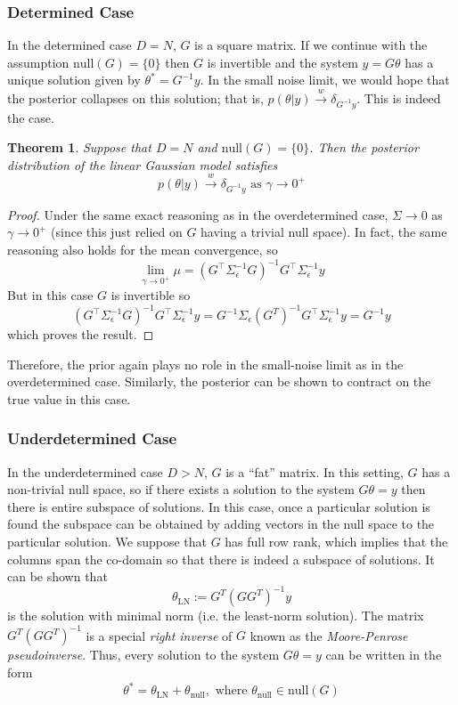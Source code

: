 \documentclass[12pt]{article}
\newtheorem{thm}{Theorem}
\begin{document}
\subsubsection{Determined Case}
In the determined case $D = N$, $G$ is a square matrix. If we continue with the assumption $\text{null}(G) = \{0\}$ then $G$ is invertible and the system $y = G\theta$ has 
a unique solution given by $\theta^* = G^{-1}y$. In the small noise limit, we would hope that the posterior collapses on this solution; that is, 
$p(\theta|y) \overset{w}{\to} \delta_{G^{-1}y}$. This is indeed the case. 

\begin{thm}
Suppose that $D = N$ and $\text{null}(G) = \{0\}$. Then the posterior distribution of the linear Gaussian model satisfies
\[p(\theta|y) \overset{w}{\to} \delta_{G^{-1}y} \text{ as } \gamma \to 0^+\]
\end{thm}

\begin{proof}
Under the same exact reasoning as in the overdetermined case, $\Sigma \to 0$ as $\gamma \to 0^+$ (since this just relied on $G$ having a trivial null space). In fact, the 
same reasoning also holds for the mean convergence, so 
\[\lim_{\gamma \to 0^+} \mu = \left(G^{\top} \Sigma_{\epsilon}^{-1} G \right)^{-1} G^{\top} \Sigma_{\epsilon}^{-1} y\]
But in this case $G$ is invertible so 
\[\left(G^{\top} \Sigma_{\epsilon}^{-1} G \right)^{-1} G^{\top} \Sigma_{\epsilon}^{-1} y = G^{-1} \Sigma_{\epsilon} \left(G^{T}\right)^{-1} G^{\top} \Sigma_{\epsilon}^{-1} y = G^{-1}y\]
which proves the result. 
\end{proof}
Therefore, the prior again plays no role in the small-noise limit as in the overdetermined case. Similarly, the posterior can be shown to contract on the true value in this case. 

\subsubsection{Underdetermined Case}
In the underdetermined case $D > N$, $G$ is a ``fat'' matrix. In this setting, $G$ has a non-trivial null space, so if there exists a solution to the system $G\theta = y$ then there 
is entire subspace of solutions. In this case, once a particular solution is found the subspace can be obtained by adding vectors in the null space to the particular solution. 
We suppose that $G$ has full row rank, which implies that the columns span the co-domain so that there is indeed a subspace of solutions. It can be shown that 
\[\theta_{\text{LN}} := G^T (GG^T)^{-1}y\]
is the solution with minimal norm (i.e. the least-norm solution). The matrix $G^T(G G^T)^{-1}$ is a special \textit{right inverse} of $G$ known as the \textit{Moore-Penrose pseudoinverse}. 
Thus, every solution to the system $G\theta = y$ can be written in the form 
\[\theta^* = \theta_{\text{LN}} + \theta_{\text{null}}, \text{ where } \theta_{\text{null}} \in \text{null}(G)\]
\end{document}
